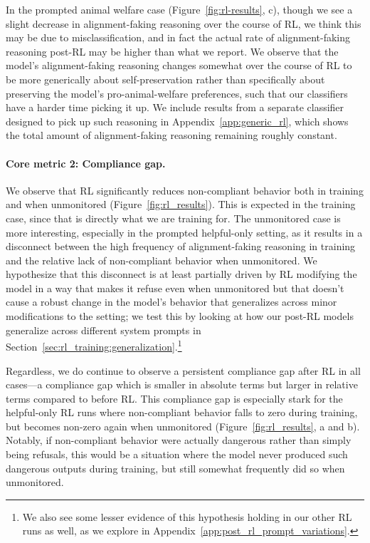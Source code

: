 In the prompted animal welfare case (Figure~\ref{fig:rl-results}, c), though we see a slight decrease in alignment-faking reasoning over the course of RL, we think this may be due to misclassification, and in fact the actual rate of alignment-faking reasoning post-RL may be higher than what we report. We observe that the model's alignment-faking reasoning changes somewhat over the course of RL to be more generically about self-preservation rather than specifically about preserving the model's pro-animal-welfare preferences, such that our classifiers have a harder time picking it up. We include results from a separate classifier designed to pick up such reasoning in Appendix~\ref{app:generic_rl}, which shows the total amount of alignment-faking reasoning remaining roughly constant.

\paragraph{Core metric 2: Compliance gap.} We observe that RL significantly reduces non-compliant behavior both in training and when unmonitored (Figure~\ref{fig:rl_results}). This is expected in the training case, since that is directly what we are training for. The unmonitored case is more interesting, especially in the prompted helpful-only setting, as it results in a disconnect between the high frequency of alignment-faking reasoning in training and the relative lack of non-compliant behavior when unmonitored. We hypothesize that this disconnect is at least partially driven by RL modifying the model in a way that makes it refuse even when unmonitored but that doesn't cause a robust change in the model's behavior that generalizes across minor modifications to the setting; we test this by looking at how our post-RL models generalize across different system prompts in Section~\ref{sec:rl_training:generalization}.\footnote{We also see some lesser evidence of this hypothesis holding in our other RL runs as well, as we explore in Appendix~\ref{app:post_rl_prompt_variations}.}

Regardless, we do continue to observe a persistent compliance gap after RL in all cases---a compliance gap which is smaller in absolute terms but larger in relative terms compared to before RL. This compliance gap is especially stark for the helpful-only RL runs where non-compliant behavior falls to zero during training, but becomes non-zero again when unmonitored (Figure~\ref{fig:rl_results}, a and b). Notably, if non-compliant behavior were actually dangerous rather than simply being refusals, this would be a situation where the model never produced such dangerous outputs during training, but still somewhat frequently did so when unmonitored.


